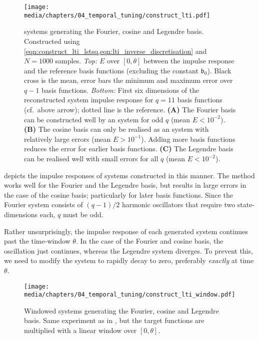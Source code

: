 \begin{figure}
	\centering
	\texttt{[image: media/chapters/04\_temporal\_tuning/construct\_lti.pdf]}
	\caption[LTI systems generating the Fourier, cosine and Legendre basis]{\LTI systems generating the Fourier, cosine and Legendre basis.
	Constructed using \cref{eqn:construct_lti_lstsq,eqn:lti_inverse_discretisation} and $N = 1000$ samples.
	\emph{Top:} \NRMSE $E$ over $[0, \theta]$ between the \LTI impulse response and the reference basis functions (excluding the constant $\mathfrak{b}_0$). Black cross is the mean, error bars the minimum and maximum error over $q - 1$ basis functions.
	\emph{Bottom:} First six dimensions of the reconstructed \LTI system impulse response for $q = 11$ basis functions (cf.~above arrow); dotted line is the reference.
	\textbf{(A)} The Fourier basis can be constructed well by an \LTI system for odd $q$ (mean $E < 10^{-2}$).
	\textbf{(B)} The cosine basis can only be realised as an \LTI system with relatively large errors (mean $E > 10^{-1}$). Adding more basis functions reduces the error for earlier basis functions.
	\textbf{(C)} The Legendre basis can be realised well with small errors for all $q$ (mean $E < 10^{-2}$).
	}
	\label{fig:construct_lti}
\end{figure}

 depicts the impulse responses of \LTI systems constructed in this manner.
The method works well for the Fourier and the Legendre basis, but results in large errors in the case of the cosine basis; particularly for later basis functions.
Since the Fourier system consists of $(q - 1) / 2$ harmonic oscillators that require two state-dimensions each, $q$ must be odd.

Rather unsurprisingly, the impulse response of each generated \LTI system continues past the time-window $\theta$.
In the case of the Fourier and cosine basis, the oscillation just continues, whereas the Legendre system diverges.
To prevent this, we need to modify the system to rapidly decay to zero, preferably \emph{exactly} at time $\theta$.

\begin{figure}
	\centering
	\texttt{[image: media/chapters/04\_temporal\_tuning/construct\_lti\_window.pdf]}
	\caption[Windowed LTI systems generating the Fourier, cosine and Legendre basis]{
	Windowed \LTI systems generating the Fourier, cosine and Legendre basis.
	Same experiment as in , but the target functions are multiplied with a linear window over $[0, \theta]$.
	}
	\label{fig:construct_lti_window}
\end{figure}

